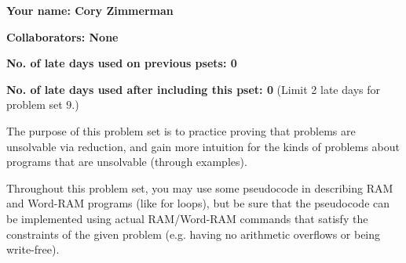 \documentclass[11pt]{article}
\begin{document}

\textbf{Your name: Cory Zimmerman}

\textbf{Collaborators: None}

\textbf{No. of late days used on previous psets: 0}

\textbf{No. of late days used after including this pset: 0} \hfill (Limit 2 late days for problem set 9.)

\vspace{1em}

\noindent The purpose of this problem set is to practice proving that problems are unsolvable via reduction, and gain more intuition for the kinds of problems about programs that are unsolvable (through examples). 

Throughout this problem set, you may use some pseudocode in describing RAM and Word-RAM programs (like for loops), but be sure that the pseudocode can be implemented using actual RAM/Word-RAM commands that satisfy the constraints of the given problem (e.g. having no arithmetic overflows or being write-free).
\end{document}
